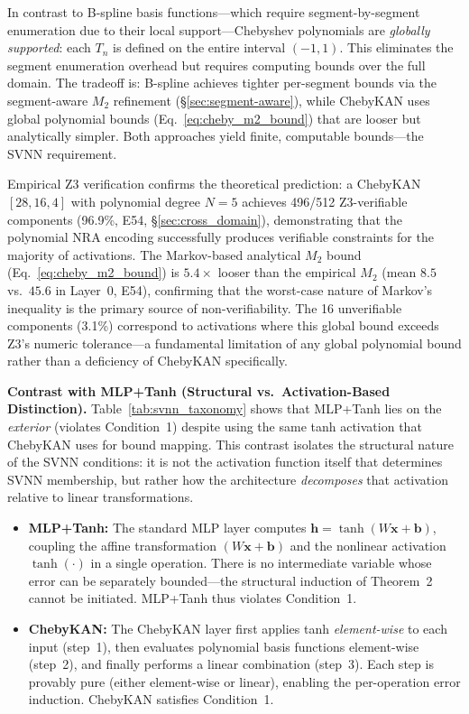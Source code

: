 In contrast to B-spline basis functions---which require segment-by-segment
enumeration due to their local support---Chebyshev polynomials are
\textit{globally supported}: each $T_n$ is defined on the entire interval
$(-1,1)$. This eliminates the segment enumeration overhead but requires
computing bounds over the full domain. The tradeoff is: B-spline achieves
tighter per-segment bounds via the segment-aware $M_2$ refinement
({\S}\ref{sec:segment-aware}), while ChebyKAN uses global polynomial
bounds (Eq.~\ref{eq:cheby_m2_bound}) that are looser but analytically
simpler. Both approaches yield finite, computable bounds---the SVNN
requirement.

Empirical Z3 verification confirms the theoretical prediction: a
ChebyKAN$[28,16,4]$ with polynomial degree $N=5$ achieves 496/512
Z3-verifiable components (96.9\%, E54, {\S}\ref{sec:cross_domain}), demonstrating that the
polynomial NRA encoding successfully produces verifiable constraints for
the majority of activations. The Markov-based analytical $M_2$ bound
(Eq.~\ref{eq:cheby_m2_bound}) is $5.4\times$ looser than the empirical
$M_2$ (mean $8.5$ vs.\ $45.6$ in Layer~0, E54), confirming that the
worst-case nature of Markov's inequality is the primary source of
non-verifiability. The 16 unverifiable components (3.1\%) correspond to
activations where this global bound exceeds Z3's numeric tolerance---a
fundamental limitation of any global polynomial bound rather than a
deficiency of ChebyKAN specifically.

\vspace{2pt}
\noindent\textbf{Contrast with MLP+Tanh (Structural vs.\ Activation-Based Distinction).}
Table~\ref{tab:svnn_taxonomy} shows that MLP+Tanh lies on the
\textit{exterior} (violates Condition~1) despite using the same tanh
activation that ChebyKAN uses for bound mapping. This contrast isolates
the structural nature of the SVNN conditions: it is not the activation
function itself that determines SVNN membership, but rather how the
architecture \textit{decomposes} that activation relative to linear
transformations.

\begin{itemize}
    \item \textbf{MLP+Tanh:} The standard MLP layer computes
          $\mathbf{h} = \tanh(W\mathbf{x} + \mathbf{b})$, coupling the
          affine transformation $(W\mathbf{x} + \mathbf{b})$ and the
          nonlinear activation $\tanh(\cdot)$ in a single operation. There
          is no intermediate variable whose error can be separately
          bounded---the structural induction of Theorem~2 cannot be
          initiated. MLP+Tanh thus violates Condition~1.

    \item \textbf{ChebyKAN:} The ChebyKAN layer first applies tanh
          \textit{element-wise} to each input (step~1), then evaluates
          polynomial basis functions element-wise (step~2), and finally
          performs a linear combination (step~3). Each step is provably
          pure (either element-wise or linear), enabling the per-operation
          error induction. ChebyKAN satisfies Condition~1.
\end{itemize}

